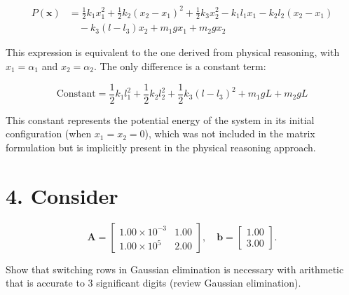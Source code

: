 \documentclass{article}
\newcommand{\mA}{\mathbf{A}}
\newcommand{\vb}{\mathbf{b}}
\begin{document}
{\[
\begin{aligned}
P(\mathbf{x}) &= \frac{1}{2} k_1 x_1^2 + \frac{1}{2} k_2 (x_2 - x_1)^2 + \frac{1}{2} k_3 x_2^2 - k_1 l_1 x_1 - k_2 l_2 (x_2 - x_1) \\
&\quad - k_3 (l - l_3) x_2 + m_1 g x_1 + m_2 g x_2
\end{aligned}
\]

This expression is equivalent to the one derived from physical reasoning, with \( x_1 = \alpha_1 \) and \( x_2 = \alpha_2 \). The only difference is a constant term:

\[
\text{Constant} = \frac{1}{2} k_1 l_1^2 + \frac{1}{2} k_2 l_2^2 + \frac{1}{2} k_3 (l - l_3)^2 + m_1 g L + m_2 g L
\]

This constant represents the potential energy of the system in its initial configuration (when \( x_1 = x_2 = 0 \)), which was not included in the matrix formulation but is implicitly present in the physical reasoning approach.

}

\section*{4. Consider}

\[
\mA = \begin{bmatrix}
1.00 \times 10^{-3} & 1.00 \\
1.00 \times 10^5 & 2.00
\end{bmatrix}, \quad
\vb = \begin{bmatrix}
1.00 \\
3.00
\end{bmatrix}.
\]

Show that switching rows in Gaussian elimination is necessary with arithmetic that is accurate to 3 significant digits (review Gaussian elimination).
\end{document}
